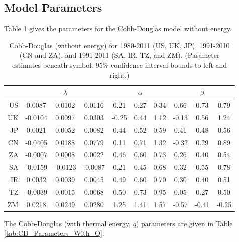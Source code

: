\documentclass[preprint,authoryear,12pt]{elsarticle}\usepackage{graphicx, color}
\begin{document}
\subsection{Model Parameters}

Table \ref{tab:CD_Parameters_No_Energy} gives the parameters for the Cobb-Douglas model without energy.

\begin{table}[H]
\begin{center}
\caption{Cobb-Douglas (without energy) for 1980-2011 (US, UK, JP), 1991-2010 (CN and ZA), and 1991-2011 (SA, IR, TZ, and ZM). (Parameter estimates beneath symbol. 95\% confidence interval bounds to left and right.)}
\label{tab:CD_Parameters_No_Energy}
{\tiny
\begin{tabular}{r|ccc|ccc|ccc}
  \hline
 &   & $\lambda$ &   &   & $\alpha$ &   &   & $\beta$ &   \\ 
  \hline
US & 0.0087 & 0.0102 & 0.0116 & 0.21 & 0.27 & 0.34 & 0.66 & 0.73 & 0.79 \\ 
  UK & -0.0104 & 0.0097 & 0.0303 & -0.25 & 0.44 & 1.12 & -0.13 & 0.56 & 1.24 \\ 
  JP & 0.0021 & 0.0052 & 0.0082 & 0.44 & 0.52 & 0.59 & 0.41 & 0.48 & 0.56 \\ 
  CN & -0.0405 & 0.0188 & 0.0779 & 0.11 & 0.71 & 1.32 & -0.32 & 0.29 & 0.89 \\ 
  ZA & -0.0007 & 0.0008 & 0.0022 & 0.46 & 0.60 & 0.73 & 0.26 & 0.40 & 0.54 \\ 
  SA & -0.0159 & -0.0123 & -0.0087 & 0.21 & 0.45 & 0.68 & 0.32 & 0.55 & 0.78 \\ 
  IR & 0.0032 & 0.0039 & 0.0045 & 0.49 & 0.60 & 0.70 & 0.30 & 0.40 & 0.51 \\ 
  TZ & -0.0039 & 0.0015 & 0.0068 & 0.50 & 0.73 & 0.95 & 0.05 & 0.27 & 0.50 \\ 
  ZM & 0.0218 & 0.0249 & 0.0280 & 1.25 & 1.41 & 1.57 & -0.57 & -0.41 & -0.25 \\ 
   \hline
\end{tabular}
}
\end{center}
\end{table}



The Cobb-Douglas (with thermal energy, $q$) parameters are given in Table \ref{tab:CD_Parameters_With_Q}.
\end{document}
